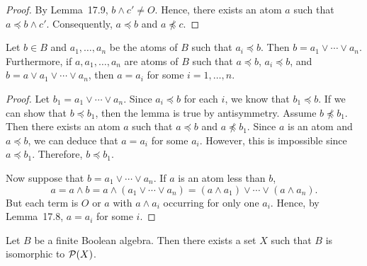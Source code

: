  
\begin{proof}
By  Lemma~17.9, $b \wedge c' \neq O$. Hence, there exists an
atom $a$ such that $a \preceq b \wedge c'$. Consequently, $a \preceq
b$ and $a \not\preceq c$.
\end{proof}
 
 
\begin{lemma}
Let $b \in B$ and $a_1, \ldots, a_n$ be the atoms of $B$ such that
$a_i \preceq b$. Then $b = a_1 \vee \cdots \vee a_n$. Furthermore, if
$a, a_1, \ldots, a_n$ are atoms of $B$ such that $a \preceq b$, $a_i
\preceq b$, and $b = a \vee a_1 \vee \cdots \vee a_n$, then $a = a_i$
for some $i = 1, \ldots, n$.    
\end{lemma} 
 
 
\begin{proof}
Let $b_1 =   a_1 \vee \cdots \vee a_n$. Since $a_i \preceq b$ for each
$i$, we know that $b_1 \preceq b$.  If we can show that $b \preceq
b_1$, then the lemma is true by antisymmetry.  Assume $b \not\preceq
b_1$. Then there exists an atom $a$ such that $a \preceq b$ and $a
\not\preceq b_1$.  Since $a$ is an atom and $a \preceq b$, we can
deduce that $a = a_i$ for  some $a_i$. However, this is impossible
since $a \preceq b_1$. Therefore, $b \preceq b_1$. 
 
 
Now suppose that $b = a_1 \vee \cdots \vee a_n$. If $a$ is an atom
less than $b$, 
$$
a 
= a \wedge b 
= a \wedge( a_1 \vee \cdots \vee a_n ) 
= (a \wedge a_1) \vee \cdots \vee ( a \wedge a_n ).
$$
But each term is $O$ or $a$ with $a \wedge a_i$ occurring for only one
$a_i$. Hence, by Lemma~17.8, $a = a_i$ for some $i$.
\end{proof}
 
 
\begin{theorem}
Let $B$ be a finite Boolean algebra.  Then there exists a set $X$ such
that $B$ is isomorphic to ${\cal P}(X)$. 
\end{theorem} 
 
